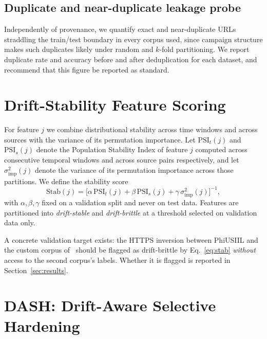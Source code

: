 \documentclass[conference]{IEEEtran}
\begin{document}
\subsection{Duplicate and near-duplicate leakage probe}

Independently of provenance, we quantify exact and near-duplicate URLs
straddling the train/test boundary in every corpus used, since campaign
structure makes such duplicates likely under random and $k$-fold partitioning.
We report duplicate rate and accuracy before and after deduplication for each
dataset, and recommend that this figure be reported as standard.

\section{Drift-Stability Feature Scoring}
\label{sec:stability-method}

For feature $j$ we combine distributional stability across time windows and
across sources with the variance of its permutation importance. Let
$\mathrm{PSI}_t(j)$ and $\mathrm{PSI}_s(j)$ denote the Population Stability
Index of feature $j$ computed across consecutive temporal windows and across
source pairs respectively, and let $\sigma^2_{\mathrm{imp}}(j)$ denote the
variance of its permutation importance across those partitions. We define the
stability score
\begin{equation}
\mathrm{Stab}(j) = \Big[\alpha\,\mathrm{PSI}_t(j)
                      + \beta\,\mathrm{PSI}_s(j)
                      + \gamma\,\sigma^2_{\mathrm{imp}}(j)\Big]^{-1},
\label{eq:stab}
\end{equation}
with $\alpha, \beta, \gamma$ fixed on a validation split and never on test data.
Features are partitioned into \emph{drift-stable} and \emph{drift-brittle} at a
threshold selected on validation data only.

A concrete validation target exists: the HTTPS inversion between PhiUSIIL and
the custom corpus of~\cite{misiek2026xgboost} should be flagged as drift-brittle
by Eq.~\eqref{eq:stab} \emph{without} access to the second corpus's labels.
Whether it is flagged is reported in Section~\ref{sec:results}.

\section{DASH: Drift-Aware Selective Hardening}
\label{sec:dash-method}
\end{document}
